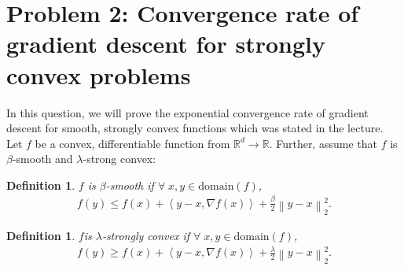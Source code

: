 \documentclass[11pt]{article}
\newcommand{\R}{\mathbb{R}}
\newcommand{\domain}{\text{domain}}
\newcommand{\inner}[2]{\left\langle #1,#2 \right\rangle}
\newcommand{\twonorm}[1]{\left\| #1\right\|_2}
\newtheorem{definition}[theorem]{Definition}
\begin{document}


\newpage
\section*{Problem 2: Convergence rate of gradient descent for strongly convex problems}

In this question, we will prove the exponential convergence rate of gradient descent for smooth, strongly convex functions which was stated in the lecture. Let $f$ be a convex, differentiable function from $\R^d \rightarrow \R$. Further, assume that $f$ is $\beta$-smooth and $\lambda$-strong convex: 

\begin{definition}
$f$ is $\beta$-smooth if $\forall\; x, y \in \domain(f)$,
\begin{align*}
    f(y) \le f(x) + \inner{y-x}{\nabla f(x)}+\frac{\beta}{2}\twonorm{y-x}^2.
\end{align*}
\end{definition}
\begin{definition}

$f$is $\lambda$-strongly convex if $\forall\; x, y \in \domain(f)$,
\begin{align*}
    f(y) \ge f(x) + \inner{y-x}{\nabla f(x)}+\frac{\lambda}{2}\twonorm{y-x}^2.
\end{align*}
\end{definition}
\end{document}
